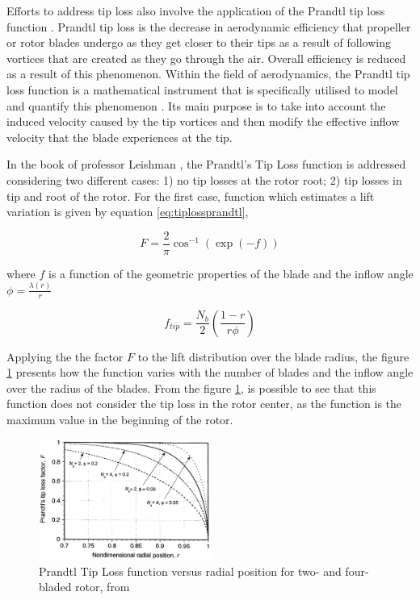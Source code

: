 Efforts to address tip loss also involve the application of the Prandtl tip loss function \cite{leishman_principles_2006, ramdin_prandtl_nodate}. Prandtl tip loss is the decrease in aerodynamic efficiency that propeller or rotor blades undergo as they get closer to their tips as a result of following vortices that are created as they go through the air. Overall efficiency is reduced as a result of this phenomenon. Within the field of aerodynamics, the Prandtl tip loss function is a mathematical instrument that is specifically utilised to model and quantify this phenomenon \cite{leishman_principles_2006}. Its main purpose is to take into account the induced velocity caused by the tip vortices and then modify the effective inflow velocity that the blade experiences at the tip.


In the book of professor Leishman \cite{leishman_principles_2006}, the Prandtl's Tip Loss function is addressed considering two different cases: 1) no tip losses at the rotor root; 2) tip losses in tip and root of the rotor. For the first case, function which estimates a lift variation is given by equation \ref{eq:tiplossprandtl},

\begin{equation}
    F = \frac{2}{\pi} \cos^{-1}\left(\exp{\left(-f\right)}\right)
    \label{eq:tiplossprandtl}
\end{equation}

\noindent where $f$ is a function of the geometric properties of the blade and the inflow angle $\phi = \frac{\lambda (r)}{r}$

\begin{equation}
    f_{tip} = \frac{N_b}{2} \left( \frac{1-r}{r\phi}\right)
\end{equation}

Applying the the factor $F$ to the lift distribution over the blade radius, the figure \ref{fig:prandtltiploss} presents how the function varies with the number of blades and the inflow angle over the radius of the blades. From the figure \ref{fig:prandtltiploss}, is possible to see that this function does not consider the tip loss in the rotor center, as the function is the maximum value in the beginning of the rotor.

\begin{figure}[!htb]
    \centering
    \includegraphics[width=0.5\textwidth]{Figures/background/tiplosses/prandtltiploss.eps}
    \caption[Prandtl Tip Loss function versus radial position for two- and four-bladed rotor]{Prandtl Tip Loss function versus radial position for two- and four-bladed rotor, from \cite{leishman_principles_2006}}
    \label{fig:prandtltiploss}
\end{figure}

